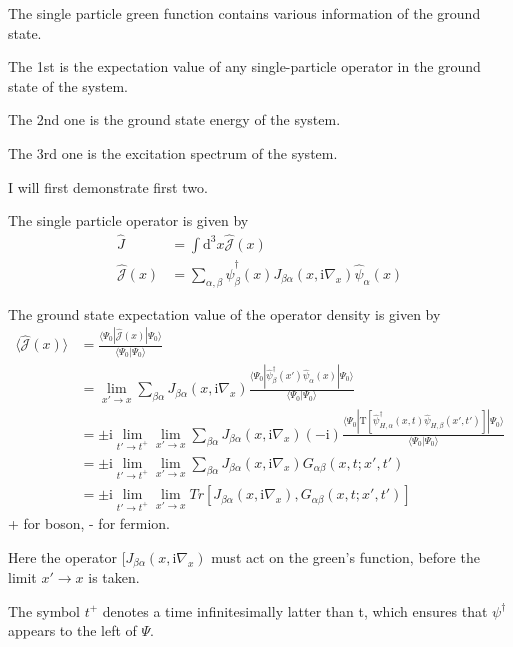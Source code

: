 ﻿\documentclass[twoside]{book}
\numberwithin{equation}{section}
\begin{document}
The single particle green function contains various information of the ground state.

The 1st is the expectation value of any single-particle operator in the ground state of the system.

The 2nd one is the ground state energy of the system.

The 3rd one is the excitation spectrum of the system.

I will first demonstrate first two.

The single particle operator is given by
\begin{align}
\hat{J}&=\int \mathrm{d}^3x \hat{\mathcal{J}}(x) \nonumber \\
\hat{\mathcal{J}}(x) &=\sum_{\alpha,\beta}\hat \psi^{\dagger}_{\beta}(x)J_{\beta\alpha}(x,\mathrm{i}\nabla_x)\hat \psi_{\alpha}(x) \nonumber
\end{align}

The ground state expectation value of the operator density is given by 
\begin{align}
\langle\hat{\mathcal{J}}(x)\rangle&=\frac{\langle\Psi_0|\hat{\mathcal{J}}(x)|\Psi_0\rangle}{\langle\Psi_0|\Psi_0\rangle} \nonumber \\
&= \lim_{x'\rightarrow x}\sum_{\beta\alpha}J_{\beta\alpha}(x,\mathrm{i}\nabla_x)\frac{\langle\Psi_0|\hat \psi^{
\dagger}_{\beta}(x')\hat \psi_{\alpha}(x)|\Psi_0\rangle}{\langle\Psi_0|\Psi_0\rangle} \nonumber \\
&=\pm \mathrm{i} \lim_{t'\rightarrow t^+} \lim_{x'\rightarrow x}\sum_{\beta\alpha}J_{\beta\alpha}(x,\mathrm{i}\nabla_x)(-\mathrm{i})\frac{\langle\Psi_0|\mathrm{T}[\hat \psi^{
\dagger}_{H,\alpha}(x,t)\hat \psi_{H,\beta} (x',t')]|\Psi_0\rangle}{\langle\Psi_0|\Psi_0\rangle} \nonumber \\
&=\pm \mathrm{i} \lim_{t'\rightarrow t^+} \lim_{x'\rightarrow x}\sum_{\beta\alpha}J_{\beta\alpha}(x,\mathrm{i}\nabla_x)G_{\alpha\beta}(x,t;x',t') \nonumber \\
&=\pm \mathrm{i} \lim_{t'\rightarrow t^+} \lim_{x'\rightarrow x} Tr[J_{\beta\alpha}(x,\mathrm{i}\nabla_x),G_{\alpha\beta}(x,t;x',t')] \nonumber
\end{align}
+ for boson, - for fermion.

Here the operator $[J_{\beta\alpha}(x,\mathrm{i}\nabla_x)$ must act on the green's function, before the limit $x'\rightarrow x$ is taken.

The symbol $t^+$ denotes a time infinitesimally latter than t, which ensures that $\psi^{\dagger}$ appears to the left of $\Psi$.
\end{document}
